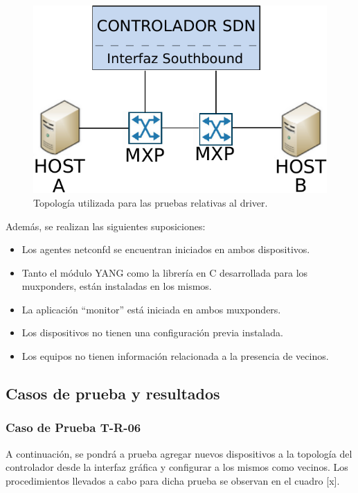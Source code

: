 \begin{figure}[!h]
	\centering
	\includegraphics[scale=0.8]{Figures/topologiatest.pdf}
	\caption{Topología utilizada para las pruebas relativas al driver.}
	\label{fig:test_topo_netconf}
  \end{figure}


  Además, se realizan las siguientes suposiciones:

\begin{itemize}
	\item Los agentes netconfd se encuentran iniciados en ambos dispositivos.
    \item Tanto el módulo YANG como la librería en C desarrollada para los muxponders, están instaladas en los mismos.
    \item La aplicación “monitor” está iniciada en ambos muxponders.
    \item Los dispositivos no tienen una configuración previa instalada. 
    \item Los equipos no tienen información relacionada a la presencia de vecinos.
\end{itemize}


\subsection{Casos de prueba y resultados}

\subsubsection{Caso de Prueba T-R-06}

A continuación, se pondrá a prueba agregar nuevos dispositivos a la topología del controlador desde la interfaz gráfica y configurar a los mismos como vecinos. Los procedimientos llevados a cabo para dicha prueba se observan en el cuadro [x].


